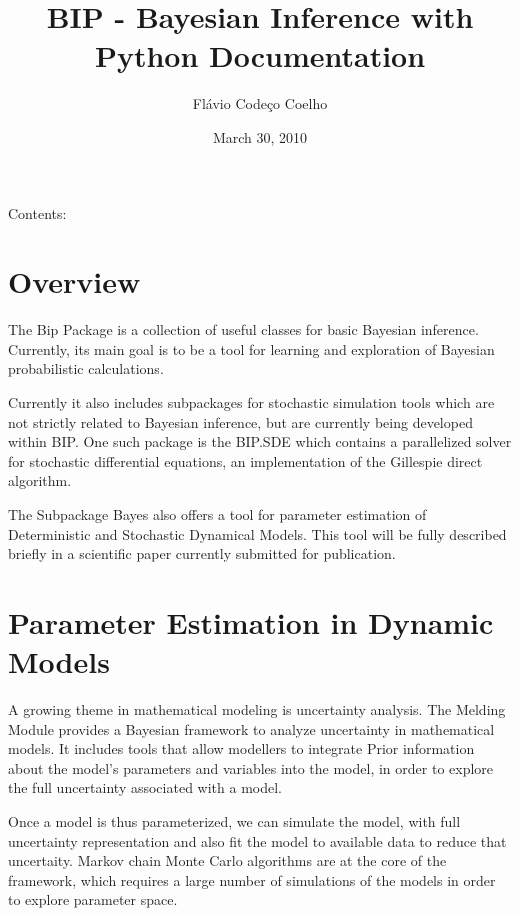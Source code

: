\documentclass[a4paper,10pt,english]{manual}
\title{BIP - Bayesian Inference with Python Documentation}
\date{March 30, 2010}
\author{Flávio Codeço Coelho}
\begin{document}
\maketitle
\tableofcontents
\hypertarget{--doc-index}{}


Contents:

\resetcurrentobjects
\hypertarget{--doc-overview}{}

\chapter{Overview}

The Bip Package is a collection of useful classes for basic Bayesian inference. Currently, its main goal is to be a tool for learning and exploration of Bayesian probabilistic calculations.

Currently it also includes subpackages for stochastic simulation tools which are not strictly related to Bayesian inference, but are currently being developed within BIP. One such package is the BIP.SDE which contains a parallelized solver for stochastic differential equations, an implementation of the Gillespie direct algorithm.

The Subpackage Bayes also offers a tool for parameter estimation of Deterministic and Stochastic Dynamical Models. This tool will be fully described briefly in a scientific paper currently submitted for publication.

\resetcurrentobjects
\hypertarget{--doc-paramest}{}

\chapter{Parameter Estimation in Dynamic Models}

A growing theme in mathematical modeling is uncertainty analysis. The Melding Module provides a Bayesian framework to analyze uncertainty in mathematical models. It includes tools that allow modellers to integrate Prior information about the model's parameters and variables into the model, in order to explore the full uncertainty associated with a model.

Once a model is thus parameterized, we can simulate the model, with full uncertainty representation and also fit the model to available data to reduce that uncertaity. Markov chain Monte Carlo algorithms are at the core of the framework, which requires a large number of simulations of the models in order to explore parameter space.
\end{document}
